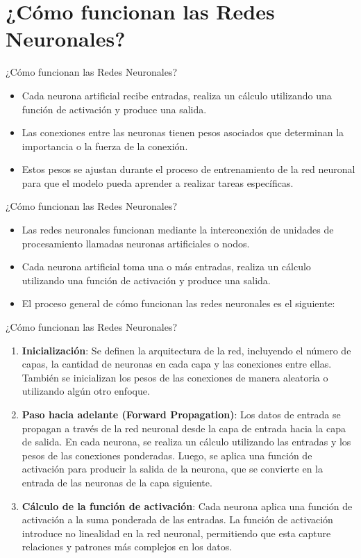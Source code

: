 \documentclass[11pt,aspectratio=169]{beamer}
\begin{document}
\section{¿Cómo funcionan las Redes Neuronales?}
\begin{frame}{¿Cómo funcionan las Redes Neuronales?}
	\begin{itemize}
		\item Cada neurona artificial recibe entradas, realiza un cálculo utilizando una función de activación y 
			produce una salida.\pause
		\item Las conexiones entre las neuronas tienen pesos asociados que determinan la importancia o la fuerza de la conexión.\pause 
		\item Estos pesos se ajustan durante el proceso de entrenamiento de la red neuronal para que el modelo pueda aprender a 
			realizar tareas específicas.
	\end{itemize}
\end{frame}
 
\begin{frame}{¿Cómo funcionan las Redes Neuronales?}
	\begin{itemize}
		\item Las redes neuronales funcionan mediante la interconexión de unidades de procesamiento llamadas neuronas artificiales o nodos.\pause
		\item Cada neurona artificial toma una o más entradas, realiza un cálculo utilizando una función de activación y produce una salida.\pause
		\item El proceso general de cómo funcionan las redes neuronales es el siguiente:
	\end{itemize}
\end{frame}

\begin{frame}{¿Cómo funcionan las Redes Neuronales?}
	\begin{enumerate}
		\item \textbf{Inicialización}: Se definen la arquitectura de la red, incluyendo el número de capas, la cantidad de neuronas en cada capa y las 
			conexiones entre ellas. También se inicializan los pesos de las conexiones de manera aleatoria o utilizando algún otro enfoque.\pause
		\item \textbf{Paso hacia adelante (Forward Propagation)}: Los datos de entrada se propagan a través de la red neuronal desde la capa de 
			entrada hacia la capa de salida. \pause En cada neurona, se realiza un cálculo utilizando las entradas y los pesos de las conexiones 
			ponderadas. \pause Luego, se aplica una función de activación para producir la salida de la neurona, que se convierte en la entrada de 
			las neuronas de la capa siguiente.\pause
		\item \textbf{Cálculo de la función de activación}: Cada neurona aplica una función de activación a la suma ponderada de las entradas. 
			\pause La función de activación introduce no linealidad en la red neuronal, permitiendo que esta capture relaciones y patrones más 
			complejos en los datos.
	\end{enumerate}
\end{frame}
\end{document}
